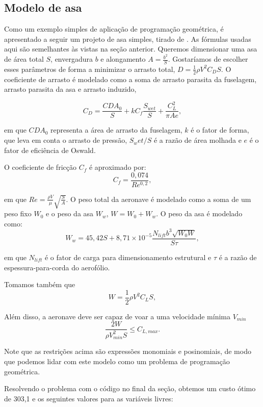 \documentclass{article}
\begin{document}
\subsection{Modelo de asa}
Como um exemplo simples de aplicação de programação geométrica, é
apresentado a seguir um projeto de asa simples, tirado de
\cite{warren}. As fórmulas usadas aqui são semelhantes às vistas na
seção anterior.  Queremos dimensionar uma asa de área total $S$,
envergadura $b$ e alongamento $A = \frac{b^2}{S}$. Gostaríamos de
escolher esses parâmetros de forma a minimizar o arrasto total, $D =
\frac{1}{2}\rho V^2 C_D S$.  O coeficiente de arrasto é modelado como
a soma de arrasto parasita da fuselagem, arrasto parasita da asa e
arrasto induzido,

\[
  C_D = \frac{CDA_0}{S} + kC_f \frac{S_{wet}}{S} + \frac{C_{L}^2}{\pi A
    e},
\]

\noindent em que $CDA_0$ representa a área de arrasto da fuselagem,
$k$ é o fator de forma, que leva em conta o arrasto de pressão,
$S_wet/S$ é a razão de área molhada e $e$ é o fator de eficiência de
Oswald.

O coeficiente de fricção $C_f$ é aproximado por:
\[
  C_f = \frac{0,074}{Re^{0,2}},
\]

\noindent em que $Re = \frac{\rho V}{\mu} \sqrt{\frac{S}{A}}$. O peso
total da aeronave é modelado como a soma de um peso fixo $W_0$ e o
peso da asa $W_w$, $W = W_0 + W_w$. O peso da asa é modelado como:
\[
  W_w = 45,42S + 8,71\times10^{-5} \frac{N_{lift}b^3\sqrt{W_0W}}{S\tau},
\]

\noindent em que $N_{lift}$ é o fator de carga para dimensionamento estrutural e
$\tau$ é a razão de espessura-para-corda do aerofólio.

Tomamos também que
\[
W = \frac{1}{2} \rho V^2 C_L S,
\]

Além disso, a aeronave deve ser capaz de voar a uma velocidade mínima
$V_{min}$
\[
  \frac{2W}{\rho V_{min}^2 S} \leq C_{L,max}.
\]


Note que as restrições acima são expressões monomiais e posinomiais,
de modo que podemos lidar com este modelo como um problema de programação
geométrica.

Resolvendo o problema com o código no final da seção, obtemos um custo ótimo de 303,1 e os seguintes
valores para as variáveis livres:
\end{document}
